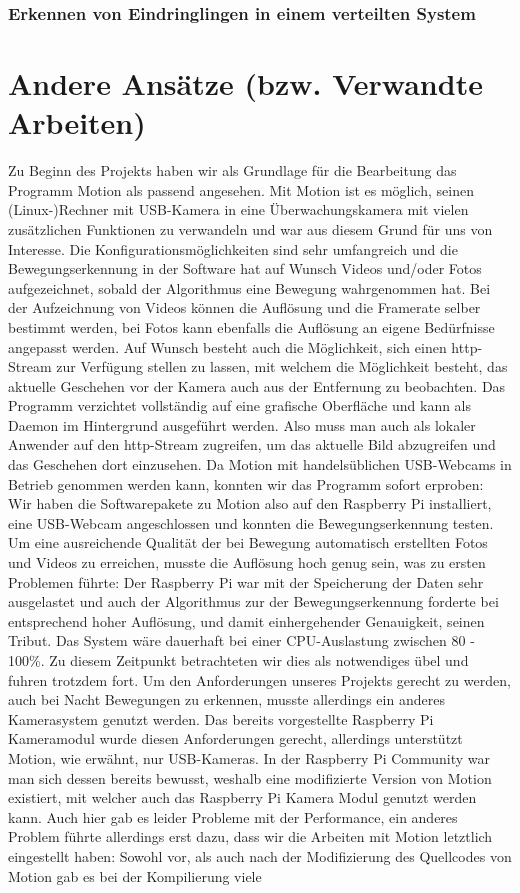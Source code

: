 \documentclass[journal]{IEEEtran}
\begin{document}
\subsubsection{Erkennen von Eindringlingen in einem verteilten System}



\section{Andere Ansätze (bzw. Verwandte Arbeiten)}
Zu Beginn des Projekts haben wir als Grundlage für die Bearbeitung das Programm Motion\cite{motion} als passend angesehen. Mit Motion ist es möglich, seinen (Linux-)Rechner mit USB-Kamera in eine Überwachungskamera mit vielen zusätzlichen Funktionen zu verwandeln und war aus diesem Grund für uns von Interesse. Die Konfigurationsmöglichkeiten sind sehr umfangreich und die Bewegungserkennung in der Software hat auf Wunsch Videos und/oder Fotos aufgezeichnet, sobald der Algorithmus eine Bewegung wahrgenommen hat. Bei der Aufzeichnung von Videos können die Auflösung und die Framerate selber bestimmt werden, bei Fotos kann ebenfalls die Auflösung an eigene Bedürfnisse angepasst werden. Auf Wunsch besteht auch die Möglichkeit, sich einen http-Stream zur Verfügung stellen zu lassen, mit welchem die Möglichkeit besteht, das aktuelle Geschehen vor der Kamera auch aus der Entfernung zu beobachten. Das Programm verzichtet vollständig auf eine grafische Oberfläche und kann als Daemon im Hintergrund ausgeführt werden. Also muss man auch als lokaler Anwender auf den http-Stream zugreifen, um das aktuelle Bild abzugreifen und das Geschehen dort einzusehen. Da Motion mit handelsüblichen USB-Webcams in Betrieb genommen werden kann, konnten wir das Programm sofort erproben: \\ Wir haben die Softwarepakete zu Motion also auf den Raspberry Pi installiert, eine USB-Webcam angeschlossen und konnten die Bewegungserkennung testen. Um eine ausreichende Qualität der bei Bewegung automatisch erstellten Fotos und Videos zu erreichen, musste die Auflösung hoch genug sein, was zu ersten Problemen führte: Der Raspberry Pi war mit der Speicherung der Daten sehr ausgelastet und auch der Algorithmus zur der Bewegungserkennung forderte bei entsprechend hoher Auflösung, und damit einhergehender Genauigkeit, seinen Tribut. Das System wäre dauerhaft bei einer CPU-Auslastung zwischen 80 - 100\%. Zu diesem Zeitpunkt betrachteten wir dies als notwendiges übel und fuhren trotzdem fort. Um den Anforderungen unseres Projekts gerecht zu werden, auch bei Nacht Bewegungen zu erkennen, musste allerdings ein anderes Kamerasystem genutzt werden. Das bereits vorgestellte Raspberry Pi Kameramodul wurde diesen Anforderungen gerecht, allerdings unterstützt Motion, wie erwähnt, nur USB-Kameras. In der Raspberry Pi Community war man sich dessen bereits bewusst, weshalb eine modifizierte Version von Motion existiert, mit welcher auch das Raspberry Pi Kamera Modul genutzt werden kann. Auch hier gab es leider Probleme mit der Performance, ein anderes Problem führte allerdings erst dazu, dass wir die Arbeiten mit Motion letztlich eingestellt haben: Sowohl vor, als auch nach der Modifizierung des Quellcodes von Motion gab es bei der Kompilierung viele 
\end{document}
